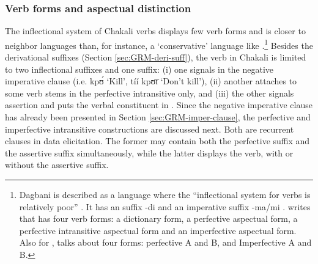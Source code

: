 \begin{exe}
\begin{exe}
\begin{exe}
\begin{exe}
\begin{exe}
\begin{exe}
\begin{exe}
\begin{exe}
\begin{exe}
\begin{exe}
\begin{exe}
\subsubsection{Verb forms and aspectual distinction}
\label{sec:GRM-verb-word}

The inflectional system of Chakali verbs displays  few verb
forms and is closer  to neighbor  languages than, for instance,  a
`conservative'  language like  \citep[51]{Bonv88}.\footnote{Dagbani is
described as a language where the ``inflectional system  for verbs is relatively
poor''  \citep[96]{Olaw99}. It has an  suffix {\sls -di}
\citep[97]{Olaw99} and  an imperative suffix {\sls -ma}/{\sls mi} 
\citep[101]{Olaw99}.
\citet[81]{Bodo97} writes that  has four verb forms: a dictionary
form, a perfective aspectual form, a perfective intransitive aspectual form and
an imperfective aspectual form. Also for , \citet{Saan03}  talks about
four forms: perfective A and B, and Imperfective A  and B.}  Besides the
derivational suffixes (Section \ref{sec:GRM-deri-suff}), the verb in Chakali is
limited to two
inflectional suffixes and one  suffix:  (i) one signals  in the
negative imperative clause (i.e.  {\sls  kpʊ́} `Kill',  {\sls tíí kpʊ̄ɪ̄} 
`Don't
kill'),  (ii) another attaches to some verb stems in the perfective intransitive
only, and (iii)  the other signals assertion and puts the verbal constituent in
. Since the negative imperative clause has already been presented in
Section
\ref{sec:GRM-imper-clause}, the perfective and imperfective intransitive
constructions are discussed next.  Both are recurrent clauses in data
elicitation. The former may contain both the perfective
suffix and the assertive suffix simultaneously, while the latter  displays the
 verb, with or without the assertive suffix.
 

\end{exe}
\end{exe}
\end{exe}
\end{exe}
\end{exe}
\end{exe}
\end{exe}
\end{exe}
\end{exe}
\end{exe}
\end{exe}
